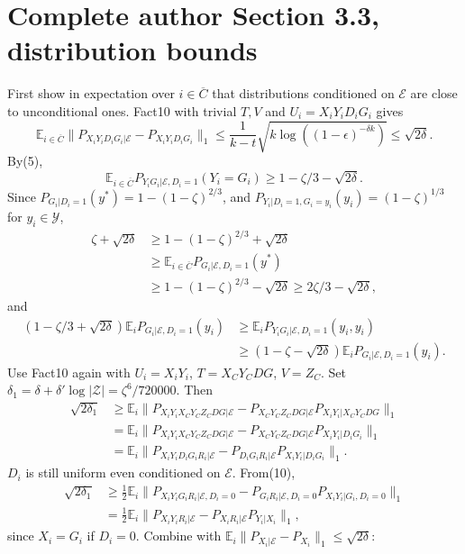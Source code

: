 \section*{Complete author Section 3.3, distribution bounds}
First show in expectation over $i\in\overline C$ that distributions conditioned on $\mathcal E$ are close to unconditional ones. Fact10 with trivial $T,V$ and $U_i=X_iY_iD_iG_i$ gives
\[\mathbb E_{i\in\overline C}\|P_{X_iY_iD_iG_i|\mathcal E}-P_{X_iY_iD_iG_i}\|_1\le\frac1{k-t}\sqrt{k\log((1-\epsilon)^{-\delta k})}\le\sqrt{2\delta}.\tag{6}\]
By(5),
\[\mathbb E_{i\in\overline C}P_{Y_iG_i|\mathcal E,D_i=1}(Y_i=G_i)\ge1-\zeta/3-\sqrt{2\delta}.\tag{7}\]
Since $P_{G_i|D_i=1}(y^*)=1-(1-\zeta)^{2/3}$, and $P_{Y_i|D_i=1,G_i=y_i}(y_i)=(1-\zeta)^{1/3}$ for $y_i\in\mathcal Y$,
\begin{align*}\zeta+\sqrt{2\delta}&\ge1-(1-\zeta)^{2/3}+\sqrt{2\delta}\\&\ge\mathbb E_{i\in\overline C}P_{G_i|\mathcal E,D_i=1}(y^*)\\&\ge1-(1-\zeta)^{2/3}-\sqrt{2\delta}\ge2\zeta/3-\sqrt{2\delta},\tag{8}\end{align*}
and
\begin{align*}(1-\zeta/3+\sqrt{2\delta})\mathbb E_iP_{G_i|\mathcal E,D_i=1}(y_i)&\ge\mathbb E_iP_{Y_iG_i|\mathcal E,D_i=1}(y_i,y_i)\\&\ge(1-\zeta-\sqrt{2\delta})\mathbb E_iP_{G_i|\mathcal E,D_i=1}(y_i).\tag{9}\end{align*}
Use Fact10 again with $U_i=X_iY_i$, $T=X_CY_CDG$, $V=Z_C$. Set $\delta_1=\delta+\delta'\log|\mathcal Z|=\zeta^6/720000$. Then
\begin{align*}\sqrt{2\delta_1}&\ge\mathbb E_i\|P_{X_iY_iX_CY_CZ_CDG|\mathcal E}-P_{X_CY_CZ_CDG|\mathcal E}P_{X_iY_i|X_CY_CDG}\|_1\\&=\mathbb E_i\|P_{X_iY_iX_CY_CZ_CDG|\mathcal E}-P_{X_CY_CZ_CDG|\mathcal E}P_{X_iY_i|D_iG_i}\|_1\\&=\mathbb E_i\|P_{X_iY_iD_iG_iR_i|\mathcal E}-P_{D_iG_iR_i|\mathcal E}P_{X_iY_i|D_iG_i}\|_1.\tag{10}\end{align*}
$D_i$ is still uniform even conditioned on $\mathcal E$. From(10),
\begin{align*}\sqrt{2\delta_1}&\ge\tfrac12\mathbb E_i\|P_{X_iY_iG_iR_i|\mathcal E,D_i=0}-P_{G_iR_i|\mathcal E,D_i=0}P_{X_iY_i|G_i,D_i=0}\|_1\\&=\tfrac12\mathbb E_i\|P_{X_iY_iR_i|\mathcal E}-P_{X_iR_i|\mathcal E}P_{Y_i|X_i}\|_1,\end{align*}
since $X_i=G_i$ if $D_i=0$. Combine with $\mathbb E_i\|P_{X_i|\mathcal E}-P_{X_i}\|_1\le\sqrt{2\delta}$:
